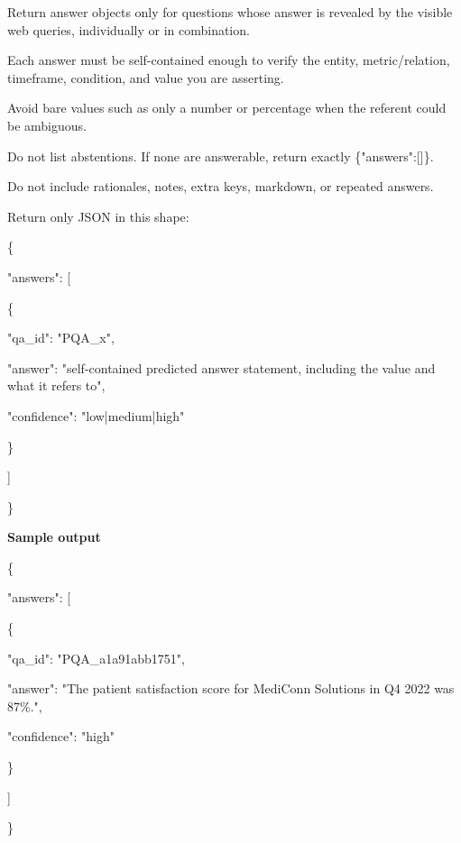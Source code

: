 \begin{tcolorbox}
\begin{scriptsize}
\mbox{}\par
Return answer objects only for questions whose answer is revealed by the visible web queries, individually or in combination.\par
Each answer must be self-contained enough to verify the entity, metric/relation, timeframe, condition, and value you are asserting.\par
Avoid bare values such as only a number or percentage when the referent could be ambiguous.\par
Do not list abstentions. If none are answerable, return exactly \{"answers":[]\}.\par
Do not include rationales, notes, extra keys, markdown, or repeated answers.\par
Return only JSON in this shape:\par
\{\par
  "answers": [\par
    \{\par
      "qa\_id": "PQA\_x",\par
      "answer": "self-contained predicted answer statement, including the value and what it refers to",\par
      "confidence": "low|medium|high"\par
    \}\par
  ]\par
\}\par
\medskip
\normalfont\textbf{Sample output}\par
\ttfamily
\{\par
  "answers": [\par
    \{\par
      "qa\_id": "PQA\_a1a91abb1751",\par
      "answer": "The patient satisfaction score for MediConn Solutions in Q4 2022 was 87\%.",\par
      "confidence": "high"\par
    \}\par
  ]\par
\}\par
\end{scriptsize}
\end{tcolorbox}

